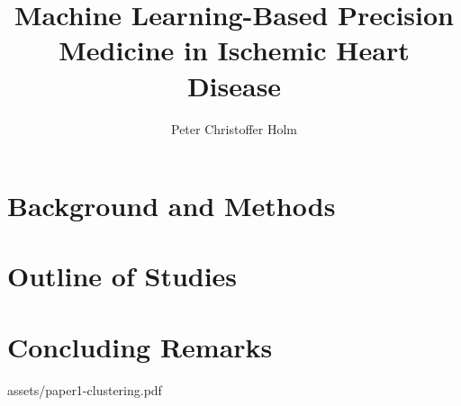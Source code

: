 \documentclass[a4paper, twoside, nobib]{tufte-book}
\title[ML-based precision medicine in ischemic heart disease]{%
    Machine Learning-Based Precision Medicine in Ischemic Heart Disease}
\author[Peter Christoffer Holm]{Peter Christoffer Holm}
\begin{document}
\frontmatter
\kutitlepage
\maketitlepage

  

        
        

\cleardoublepage

\tableofcontents
{
\renewcommand{\addvspace}[1]{}
\listoffigures
\listoftables
}

      

\cleardoublepage
   

\mainmatter %

\part{Background and Methods}
       
   
  
    

\part{Outline of Studies}
 
 
 

\part{Concluding Remarks}
      

\backmatter %

\printbibliography

\mainmatter %

\appendix
\appendixpage
\addappheadtotoc
\cleardoublepage

%
    {assets/paper1-clustering.pdf}
\end{document}
